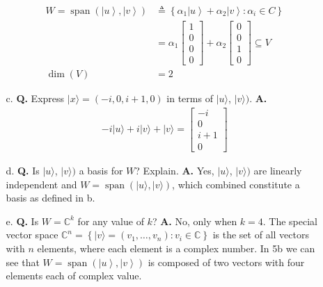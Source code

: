 \documentclass[main.tex]{subfiles}
\begin{document}
\begin{enumerate}
\begin{enumerate}
        \begin{align*}
            W = \operatorname{span}\left(\left|u\right\rangle,\left|v\right\rangle\right) 
            & \triangleq\left\{\alpha_{1}\left|u\right\rangle+\alpha_{2}\left|v\right\rangle: \alpha_{i} \in C\right\} \\
            & = \alpha_1 \left[\begin{array}{l} 1 \\ 0 \\ 0 \\ 0 \end{array}\right] + \alpha_2 \left[\begin{array}{l} 0 \\ 0 \\ 1 \\ 0 \end{array}\right] \subseteq V \\
            \operatorname{dim}(V) & = 2 
        \end{align*}
        
        \item[c.] \textbf{Q.} Express $|x\rangle=(-i, 0, i+1,0)$ in terms of $|u\rangle$, $|v\rangle)$. \textbf{A.}
        \begin{align*}
            -i |u\rangle + i |v\rangle + |v\rangle = \left[\begin{array}{l} -i \\ 0 \\ i+1 \\ 0 \end{array}\right] 
        \end{align*}
        
        \item[d.] \textbf{Q.} Is $|u\rangle$, $|v\rangle)$ a basis for $W$? Explain. \textbf{A.} Yes, $|u\rangle$, $|v\rangle)$ are linearly independent and $W=\operatorname{span}(|u\rangle,|v\rangle)$, which combined constitute a basis as defined in b.
        \item[e.] \textbf{Q.} Is $W=\mathbb{C}^{k}$ for any value of $k$? \textbf{A.} No, only when $k=4$. The special vector space $\mathbb{C}^{n}=\left\{|v\rangle=\left(v_{1}, \ldots, v_{n}\right): v_{i} \in \mathbb{C}\right\}$ is the set of all vectors with $n$ elements, where each element is a complex number. In 5b we can see that $W = \operatorname{span}\left(\left|u\right\rangle,\left|v\right\rangle\right)$ is composed of two vectors with four elements each of complex value. 

    \end{enumerate}
    

\end{enumerate}
\end{document}
